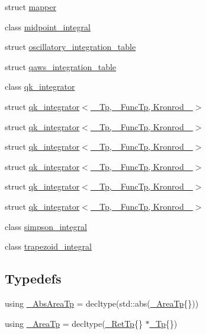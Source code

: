 \begin{DoxyCompactItemize}
struct \hyperlink{struct____gnu__cxx_1_1mapper}{mapper}
\item 
class \hyperlink{class____gnu__cxx_1_1midpoint__integral}{midpoint\+\_\+integral}
\item 
struct \hyperlink{struct____gnu__cxx_1_1oscillatory__integration__table}{oscillatory\+\_\+integration\+\_\+table}
\item 
struct \hyperlink{struct____gnu__cxx_1_1qaws__integration__table}{qaws\+\_\+integration\+\_\+table}
\item 
class \hyperlink{class____gnu__cxx_1_1qk__integrator}{qk\+\_\+integrator}
\item 
struct \hyperlink{struct____gnu__cxx_1_1qk__integrator_3_01__Tp_00_01__FuncTp_00_01Kronrod__15_01_4}{qk\+\_\+integrator$<$ \+\_\+\+Tp, \+\_\+\+Func\+Tp, Kronrod\+\_ $>$}
\item 
struct \hyperlink{struct____gnu__cxx_1_1qk__integrator_3_01__Tp_00_01__FuncTp_00_01Kronrod__21_01_4}{qk\+\_\+integrator$<$ \+\_\+\+Tp, \+\_\+\+Func\+Tp, Kronrod\+\_ $>$}
\item 
struct \hyperlink{struct____gnu__cxx_1_1qk__integrator_3_01__Tp_00_01__FuncTp_00_01Kronrod__31_01_4}{qk\+\_\+integrator$<$ \+\_\+\+Tp, \+\_\+\+Func\+Tp, Kronrod\+\_ $>$}
\item 
struct \hyperlink{struct____gnu__cxx_1_1qk__integrator_3_01__Tp_00_01__FuncTp_00_01Kronrod__41_01_4}{qk\+\_\+integrator$<$ \+\_\+\+Tp, \+\_\+\+Func\+Tp, Kronrod\+\_ $>$}
\item 
struct \hyperlink{struct____gnu__cxx_1_1qk__integrator_3_01__Tp_00_01__FuncTp_00_01Kronrod__51_01_4}{qk\+\_\+integrator$<$ \+\_\+\+Tp, \+\_\+\+Func\+Tp, Kronrod\+\_ $>$}
\item 
struct \hyperlink{struct____gnu__cxx_1_1qk__integrator_3_01__Tp_00_01__FuncTp_00_01Kronrod__61_01_4}{qk\+\_\+integrator$<$ \+\_\+\+Tp, \+\_\+\+Func\+Tp, Kronrod\+\_ $>$}
\item 
class \hyperlink{class____gnu__cxx_1_1simpson__integral}{simpson\+\_\+integral}
\item 
class \hyperlink{class____gnu__cxx_1_1trapezoid__integral}{trapezoid\+\_\+integral}
\end{DoxyCompactItemize}
\subsection*{Typedefs}
\begin{DoxyCompactItemize}
\item 
using \hyperlink{namespace____gnu__cxx_a2f005089fd7e29a63d4165c56a5f4235}{\+\_\+\+Abs\+Area\+Tp} = decltype(std\+::abs(\hyperlink{namespace____gnu__cxx_ae97a51b75e19c30f48d27fac4664de6e}{\+\_\+\+Area\+Tp}\{\}))
\item 
using \hyperlink{namespace____gnu__cxx_ae97a51b75e19c30f48d27fac4664de6e}{\+\_\+\+Area\+Tp} = decltype(\hyperlink{namespace____gnu__cxx_a886e03ece3d53ff7fa6c098a40f93fa5}{\+\_\+\+Ret\+Tp}\{\} $\ast$\hyperlink{namespace____gnu__cxx_a3b19a9c800ca194374ef9172290f7d79}{\+\_\+\+Tp}\{\})
\end{DoxyCompactItemize}
